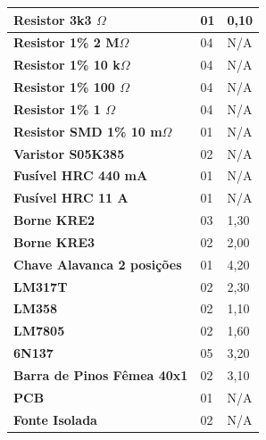 \begin{table}[!ht]
\begin{tabular}{|l|l|l|}
        \textbf{Resistor 3k3 $\Omega$}         & 01                  & 0,10                             \\ \hline
        \textbf{Resistor 1\% 2 M$\Omega$}      & 04                  & N/A                              \\ \hline
        \textbf{Resistor 1\% 10 k$\Omega$}     & 04                  & N/A                              \\ \hline
        \textbf{Resistor 1\% 100 $\Omega$}     & 04                  & N/A                              \\ \hline
        \textbf{Resistor 1\% 1 $\Omega$}       & 04                  & N/A                              \\ \hline
        \textbf{Resistor SMD 1\% 10 m$\Omega$} & 01                  & N/A                              \\ \hline
        \textbf{Varistor S05K385}              & 02                  & N/A                              \\ \hline
        \textbf{Fusível HRC 440 mA}            & 01                  & N/A                              \\ \hline
        \textbf{Fusível HRC 11 A}              & 01                  & N/A                              \\ \hline
        \textbf{Borne KRE2}                    & 03                  & 1,30                             \\ \hline
        \textbf{Borne KRE3}                    & 02                  & 2,00                             \\ \hline
        \textbf{Chave Alavanca 2 posições}     & 01                  & 4,20                             \\ \hline
        \textbf{LM317T}                        & 02                  & 2,30                             \\ \hline
        \textbf{LM358}                         & 02                  & 1,10                             \\ \hline
        \textbf{LM7805}                        & 02                  & 1,60                             \\ \hline
        \textbf{6N137}                         & 05                  & 3,20                             \\ \hline
        \textbf{Barra de Pinos Fêmea 40x1}     & 02                  & 3,10                             \\ \hline
        \textbf{PCB}                           & 01                  & N/A                              \\ \hline
        \textbf{Fonte Isolada}                 & 02                  & N/A                              \\ \hline
    \end{tabular}
\end{table}